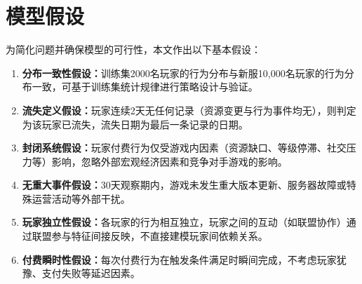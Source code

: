\section{模型假设}

为简化问题并确保模型的可行性，本文作出以下基本假设：

\begin{enumerate}
    \item \textbf{分布一致性假设：}训练集2000名玩家的行为分布与新服10,000名玩家的行为分布一致，可基于训练集统计规律进行策略设计与验证。
    \item \textbf{流失定义假设：}玩家连续2天无任何记录（资源变更与行为事件均无），则判定为该玩家已流失，流失日期为最后一条记录的日期。
    \item \textbf{封闭系统假设：}玩家付费行为仅受游戏内因素（资源缺口、等级停滞、社交压力等）影响，忽略外部宏观经济因素和竞争对手游戏的影响。
    \item \textbf{无重大事件假设：}30天观察期内，游戏未发生重大版本更新、服务器故障或特殊运营活动等外部干扰。
    \item \textbf{玩家独立性假设：}各玩家的行为相互独立，玩家之间的互动（如联盟协作）通过联盟参与特征间接反映，不直接建模玩家间依赖关系。
    \item \textbf{付费瞬时性假设：}每次付费行为在触发条件满足时瞬间完成，不考虑玩家犹豫、支付失败等延迟因素。
\end{enumerate}
